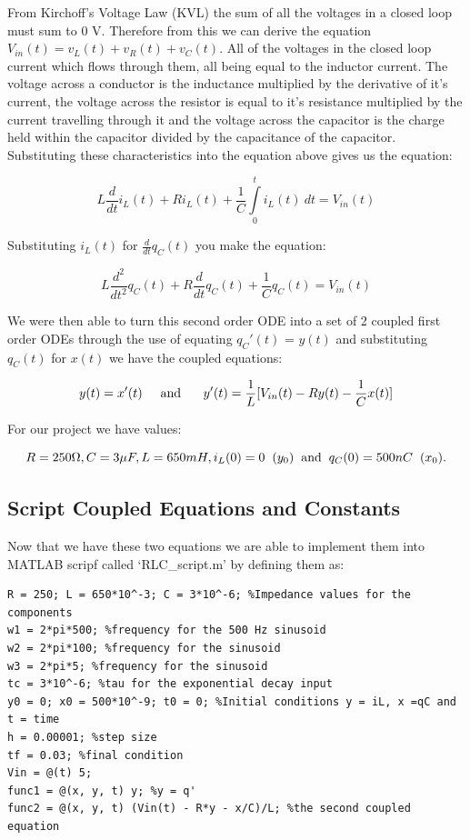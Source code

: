 \documentclass[11pt,a4paper]{article}
\begin{document}

From Kirchoff's Voltage Law (KVL) the sum of all the voltages in a closed loop must sum to 0 V. Therefore from this we can derive the equation $V_{in}(t) = v_L(t)+v_R(t)+v_C(t)$. All of the voltages in the closed loop current which flows through them, all being equal to the inductor current. The voltage across a conductor is the inductance multiplied by the derivative of it's current, the voltage across the resistor is equal to it's resistance multiplied by the current travelling through it and the voltage across the capacitor is the charge held within the capacitor divided by the capacitance of the capacitor. Substituting these characteristics into the equation above gives us the equation:

\[ L \frac{d}{dt}i_L(t) + R i_L(t) + \frac{1}{C}\int\limits_0^t i_L(t) \ dt = V_{in}(t)\]

Substituting $i_L(t)$ for $\frac{d}{dt}q_C(t)$ you make the equation:

\[ L \frac{d^2}{dt^2}q_C(t) + R\frac{d}{dt}q_C(t) + \frac{1}{C}q_C(t) = V_{in}(t)\]

We were then able to turn this second order ODE into a set of 2 coupled first order ODEs through the use of equating $q_C'(t)$ = $y(t)$ and substituting $q_C(t)$ for $x(t)$ we have the coupled equations:

\[y(t) = x'(t) \text{\hspace{5mm}and \hspace{5mm}}y'(t) = \frac{1}{L}[V_{in}(t)  - Ry(t) - \frac{1}{C}x(t)] \]

For our project we have values:

\[R = 250 \Omega, C = 3 \mu F , L = 650 mH, i_L(0) = 0 \hspace{2mm} (y_0) \text{\hspace{2mm}and\hspace{2mm}} q_C(0) = 500nC \hspace{2mm} (x_0).\]

\subsection{Script Coupled Equations and Constants}

Now that we have these two equations we are able to implement them into MATLAB scripf called `RLC\_script.m' by defining them as:

\begin{verbatim}
R = 250; L = 650*10^-3; C = 3*10^-6; %Impedance values for the components
w1 = 2*pi*500; %frequency for the 500 Hz sinusoid
w2 = 2*pi*100; %frequency for the sinusoid
w3 = 2*pi*5; %frequency for the sinusoid
tc = 3*10^-6; %tau for the exponential decay input
y0 = 0; x0 = 500*10^-9; t0 = 0; %Initial conditions y = iL, x =qC and t = time
h = 0.00001; %step size
tf = 0.03; %final condition
Vin = @(t) 5;
func1 = @(x, y, t) y; %y = q'
func2 = @(x, y, t) (Vin(t) - R*y - x/C)/L; %the second coupled equation
\end{verbatim}
\end{document}
